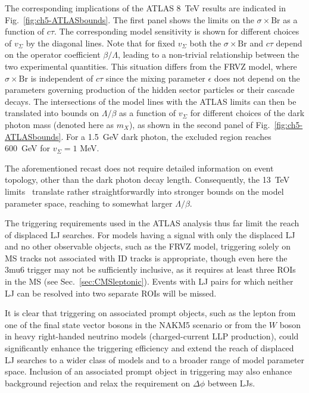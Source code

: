 The corresponding implications of the ATLAS 8~TeV results are indicated in Fig.~\ref{fig:ch5-ATLASbounds}. The first panel shows the limits on the $\sigma\times\mathrm{Br}$ as a function of $c\tau$. The corresponding model sensitivity is shown for different choices of $v_\Sigma$ by the diagonal lines. Note that for fixed $v_\Sigma$ both the $\sigma\times\mathrm{Br}$ and $c\tau$ depend on the operator coefficient $\beta/\Lambda$, leading to a non-trivial relationship between the two experimental quantities. This situation differs from the FRVZ model, where $\sigma\times\mathrm{Br}$ is independent of $c\tau$ since the mixing parameter $\epsilon$ does not depend on the parameters governing production of the hidden sector particles or their cascade decays. The intersections of the model lines with the ATLAS limits can then be translated into bounds on $\Lambda/\beta$ as a function of $v_\Sigma$ for different choices of the dark photon mass (denoted here as $m_X$), as shown in the second panel of Fig.~\ref{fig:ch5-ATLASbounds}. For a 1.5~GeV dark photon, the excluded region reaches \mbox{600~GeV} for $v_\Sigma = 1 $ MeV.

The aforementioned recast does not require detailed information on event topology, other than the dark photon decay length. Consequently, the 13~TeV limits~\cite{ATLAS-CONF-2016-042} translate rather straightforwardly into stronger bounds on the model parameter space, reaching to somewhat larger $\Lambda/\beta$.

\vskip 0.1in
\vskip 0.1in

The triggering requirements used in the ATLAS analysis thus far limit the reach of displaced LJ searches. For models having a signal with only the displaced LJ and no other observable objects, such as the FRVZ model, triggering solely on MS tracks not associated with ID tracks is appropriate, though even here the 3mu6 trigger may not be sufficiently inclusive, as it requires at least three ROIs in the MS (see Sec.~\ref{sec:CMSleptonic}). Events with LJ pairs for which neither LJ can be resolved into two separate ROIs will be missed.

It is clear that triggering on associated prompt objects, such as the lepton from one of the final state vector bosons in the NAKM5 scenario or from the $W$ boson in heavy right-handed neutrino models (charged-current LLP production), could significantly enhance the triggering efficiency and extend the reach of displaced LJ searches to a wider class of models and to a broader range of model parameter space. Inclusion of an associated prompt object in triggering may also enhance background rejection and relax the requirement on $\Delta\phi$ between LJs.

